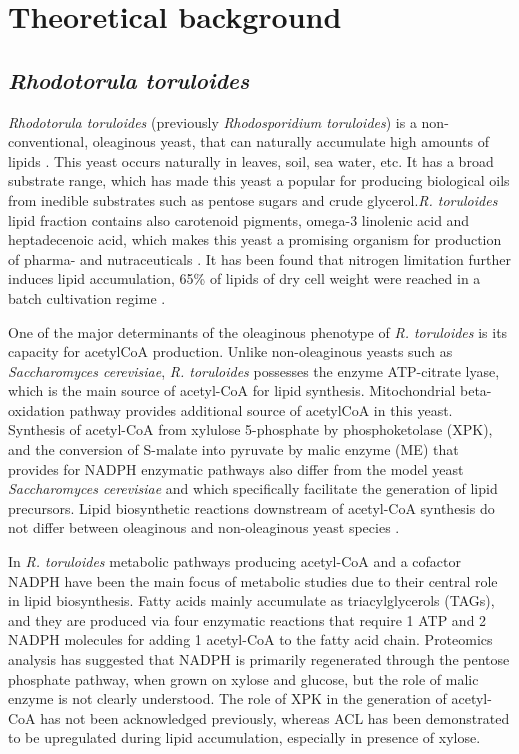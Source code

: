 \chapter{Theoretical background}

\section{\textit{Rhodotorula toruloides}}

\textit{Rhodotorula toruloides} (previously \textit{Rhodosporidium toruloides}) is a non-conventional, oleaginous yeast, 
that can naturally accumulate
high amounts of lipids \cite{Rekena2023}. This yeast occurs naturally in leaves, soil, sea water, etc. It has a broad substrate range, 
which has made this yeast a popular for producing biological oils from inedible 
substrates such as pentose sugars and crude glycerol.\textit{R. toruloides} lipid fraction contains also carotenoid pigments, 
omega-3 linolenic acid and heptadecenoic acid,
which makes this yeast a promising organism for production of pharma- and nutraceuticals \cite{Tiukova2019}. 
It has been found that nitrogen limitation further induces lipid accumulation, 
65\% of lipids of dry cell weight were reached in a batch cultivation regime \cite{Rekena2023}.

One of the major determinants of the oleaginous phenotype of \textit{R. toruloides} is its capacity for acetylCoA production. 
Unlike non-oleaginous yeasts such as \textit{Saccharomyces cerevisiae}, \textit{R. toruloides} possesses the enzyme ATP-citrate lyase, 
which is the main source of acetyl-CoA for lipid
synthesis. Mitochondrial beta-oxidation pathway provides additional source of acetylCoA in this yeast. \cite{Tiukova2019}
Synthesis of acetyl-CoA from xylulose 5-phosphate by phosphoketolase (XPK), and the conversion of S-malate into pyruvate by 
malic enzyme (ME) that provides for NADPH enzymatic pathways also differ from the model yeast \textit{Saccharomyces
cerevisiae} and which specifically facilitate the generation of lipid precursors.\cite{Rekena2023}
Lipid biosynthetic reactions downstream of acetyl-CoA synthesis do not differ between oleaginous and non-oleaginous 
yeast species \cite{Tiukova2019}.

In \textit{R. toruloides} metabolic pathways producing acetyl-CoA and a cofactor NADPH
have been the main focus of metabolic studies due to their central role in lipid
biosynthesis. Fatty acids mainly accumulate as triacylglycerols (TAGs), and they are
produced via four enzymatic reactions that require 1 ATP and 2 NADPH molecules for adding 1 acetyl-CoA to the fatty acid chain.
Proteomics analysis has suggested that NADPH is primarily regenerated through the pentose phosphate pathway, when grown on xylose 
and glucose, but the role of malic enzyme is not clearly understood. The
role of XPK in the generation of acetyl-CoA has not been acknowledged previously, whereas
ACL has been demonstrated to be upregulated during lipid accumulation, especially in
presence of xylose.\cite{Rekena2023}


